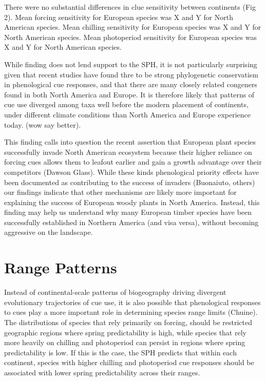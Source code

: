 \documentclass[12pt]{article}
\begin{document}
There were no substantial differences in clue sensitivity between continents (Fig 2). Mean forcing sensitivity for European species was X  and Y for North American species. Mean chilling sensitivity for European species was X  and Y for North American species. Mean photoperiod sensitivity for European species was X  and Y for North American species.

While finding does not lend support to the SPH, it is not particularly surprising given that recent studies have found thre to be strong phylogenetic conservatism in phenological cue responses, and that there are many closely related congeners found in both North America and Europe. It is therefore likely that patterns of cue use diverged among taxa well before the modern placement of continents, under different climate conditions than North America and Europe experience today. (wow say better).  

This finding calls into question the recent assertion that European plant species successfully invade North American ecosystem because their higher reliance on forcing cues allows them to leafout earlier and gain a growth advantage over their competitors (Dawson Glass). While these kinds phenological priority effects have been documented as contributing to the success of invaders (Buonaiuto, others) our findings indicate that other mechanisms are likely more important for explaining the success of European woody plants in North America. Instead, this finding may help us understand why many European timber species have been successfully established in Northern America (and visa versa), without becoming aggressive on the landscape.

\section*{Range Patterns}
Instead of continental-scale patterns of biogeography driving divergent evolutionary trajectories of cue use, it is also possible that phenological responses to cues play a more important role in determining species range limits (Chuine). The distributions of species that rely primarily on forcing, should be restricted geographic regions where spring predictability is high, while species that rely more heavily on chilling and photoperiod can persist in regions where spring predictability is low. If this is the case, the SPH predicts that within each continent, species with higher chilling and photoperiod cue responses should be associated with lower spring predictability across their ranges.
\end{document}
